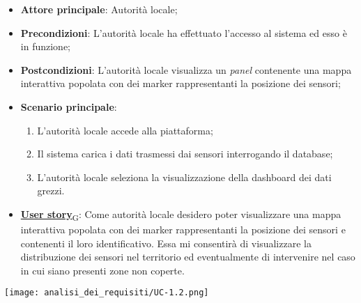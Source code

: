 \begin{itemize}
	\item \textbf{Attore principale}: Autorità locale;
	\item \textbf{Precondizioni}: L'autorità locale ha effettuato l'accesso al sistema ed esso è in funzione;
	\item \textbf{Postcondizioni}: L'autorità locale visualizza un \textit{panel} contenente una mappa interattiva
	      popolata con dei marker rappresentanti la posizione dei sensori;
	\item \textbf{Scenario principale}:
	      \begin{enumerate}
		      \item L'autorità locale accede alla piattaforma;
		      \item Il sistema carica i dati trasmessi dai sensori interrogando il database;
		      \item L'autorità locale seleziona la visualizzazione della dashboard dei dati grezzi.
	      \end{enumerate}
	\item \href{https://7last.github.io/docs/rtb/documentazione-interna/glossario\#user-story}{\textbf{User story}\textsubscript{G}}: Come autorità locale desidero poter visualizzare una mappa interattiva popolata con dei marker rappresentanti
	      la posizione dei sensori e contenenti il loro identificativo. Essa mi consentirà di visualizzare la distribuzione dei sensori nel territorio
	      ed eventualmente di intervenire nel caso in cui siano presenti zone non coperte.
\end{itemize}
\begin{center}
	\texttt{[image: analisi\_dei\_requisiti/UC-1.2.png]}
\end{center}

